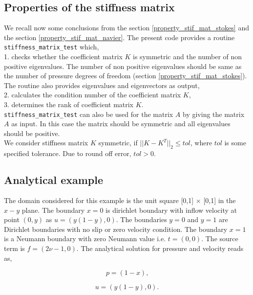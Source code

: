 \documentclass[a4paper,twoside,openright]{book}
\begin{document}
\subsection{Properties of the stiffness matrix}

We recall now some conclusions from the section \ref{property_stif_mat_stokes} and the section \ref{property_stif_mat_navier}. The present code provides a routine \verb|stiffness_matrix_test| which, \\

1. checks whether the coefficient matrix $K$ is symmetric and the number of non positive eigenvalues. The number of non positive eigenvalues should be same as the number of pressure degrees of freedom (section \ref{property_stif_mat_stokes}). The routine also provides eigenvalues and eigenvectors as output,\\

2. calculates the condition number of the coefficient matrix $K$, \\

3. determines the rank of coefficient matrix $K$.\\

\verb|stiffness_matrix_test| can also be used for the matrix $A$ by giving the matrix $A$ as input. In this case the matrix should be symmetric and all eigenvalues should be positive.\\

We consider stiffness matrix $K$ symmetric, if $||K-K^T||_2 \leq tol$, where $tol$ is some specified tolerance. Due to round off error, $tol > 0$.   

\subsection{Analytical example}

The domain considered for this example is the unit square [0,1] $\times$ [0,1] in the $x-y$ plane. 
The boundary ${x=0}$ is dirichlet boundary with inflow velocity at point $(0,y)$ as $u = (y(1-y), 0)$. The boundaries ${y = 0}$ and ${y = 1}$ are Dirichlet boundaries with no slip or zero velocity condition. The boundary ${x = 1}$ is a Neumann boundary with zero Neumann value i.e. $t = (0, 0)$. The source term is $f = (2 \nu - 1, 0)$. The analytical solution for pressure and velocity reads as,

\begin{center}

\begin{equation}
p = (1 - x) \textrm{,}
\end{equation}

\begin{equation} 
 u = (y(1-y), 0) \textrm{.}
\end{equation}

\end{center}
\end{document}
